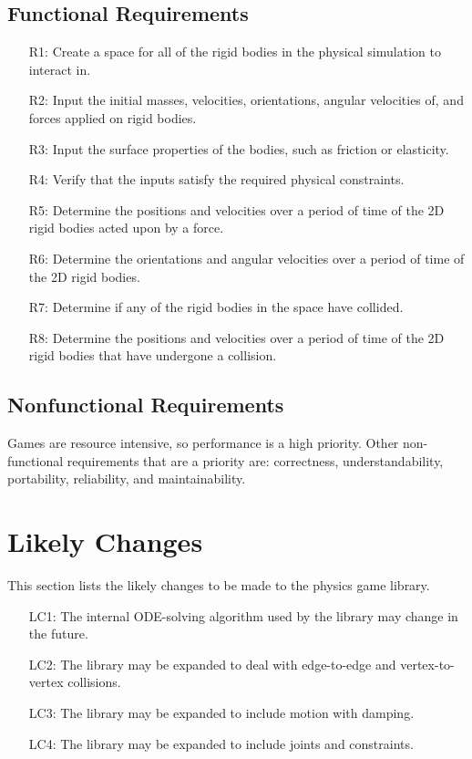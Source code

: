 \documentclass[12pt]{article}
\begin{document}
\subsection{Functional Requirements}
\label{Sec:FRs}
\begin{itemize}
\item[R1:]Create a space for all of the rigid bodies in the physical simulation to interact in.
\item[R2:]Input the initial masses, velocities, orientations, angular velocities of, and forces applied on rigid bodies.
\item[R3:]Input the surface properties of the bodies, such as friction or elasticity.
\item[R4:]Verify that the inputs satisfy the required physical constraints.
\item[R5:]Determine the positions and velocities over a period of time of the 2D rigid bodies acted upon by a force.
\item[R6:]Determine the orientations and angular velocities over a period of time of the 2D rigid bodies.
\item[R7:]Determine if any of the rigid bodies in the space have collided.
\item[R8:]Determine the positions and velocities over a period of time of the 2D rigid bodies that have undergone a collision.
\end{itemize}
\subsection{Nonfunctional Requirements}
\label{Sec:NRs}
Games are resource intensive, so performance is a high priority. Other non-functional requirements that are a priority are: correctness, understandability, portability, reliability, and maintainability.
\section{Likely Changes}
\label{Sec:LCs}
This section lists the likely changes to be made to the physics game library.
\begin{itemize}
\item[LC1:]The internal ODE-solving algorithm used by the library may change in the future.
\item[LC2:]The library may be expanded to deal with edge-to-edge and vertex-to-vertex collisions.
\item[LC3:]The library may be expanded to include motion with damping.
\item[LC4:]The library may be expanded to include joints and constraints.
\end{itemize}
\end{document}
